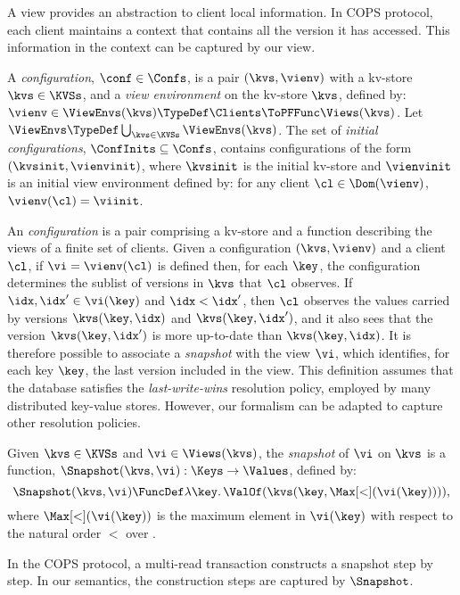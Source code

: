 A view provides an abstraction to client local information.
In COPS protocol, each client maintains a context that contains all the version it has accessed.
This information in the context can be captured by our view.

\begin{definition}[Configurations]
\label{def:configurations}
A \emph{configuration}, \(\conf \in \Confs\),  is a pair \((\kvs, \vienv)\)
with a kv-store \(\kvs \in \KVSs\),
and a \emph{view environment} on the kv-store \( \kvs \),
defined by: \(\vienv \in \ViewEnvs(\kvs) \TypeDef \Clients \ToPFFunc \Views(\kvs)\). 
Let \( \ViewEnvs \TypeDef \bigcup_{\kvs \in \KVSs} \ViewEnvs(\kvs)\).
The set of \emph{initial configurations}, \(\ConfInits \subseteq \Confs\),
contains configurations of the form \( (\kvsinit, \vienvinit)\),
where \( \kvsinit \) is the initial kv-store 
and \( \vienvinit \) is an initial view environment 
defined by: for any client \( \cl \in \Dom(\vienv)\), \( \vienv(\cl) = \viinit \).
\end{definition}

An \emph{configuration} is a pair comprising a kv-store and a function describing the
views of a finite set of clients. 
Given a configuration \((\kvs, \vienv)\) and a client \(\cl\), 
if \(\vi = \vienv(\cl)\) is defined then, for each \(\key\), 
the configuration determines the sublist of versions in \(\kvs\) that \(\cl\) observes.
If \(\idx, \idx' \in \vi(\key)\) and \(\idx < \idx'\), then \(\cl\) observes the values 
carried by versions \(\kvs(\key, \idx)\) and  \(\kvs(\key, \idx')\), 
and it also sees that the version \(\kvs(\key, \idx')\) is more up-to-date than \(\kvs(\key, \idx)\). 
It is therefore possible to associate a \emph{snapshot} with the view \(\vi\), 
which identifies, for each key \(\key\), the last version included in the view. 
This definition assumes that the database satisfies the \emph{last-write-wins}
resolution policy, employed by many distributed key-value stores.
However, our formalism can be adapted to capture other resolution policies. 

\begin{definition}
\label{def:view-snapshot}
Given \(\kvs \in \KVSs\) and \(\vi \in \Views(\kvs)\),
the \emph{snapshot} of \(\vi\) on \(\kvs\) is a function, 
\(\Snapshot(\kvs, \vi) : \Keys \to \Values\),
defined by:
\[
    \Snapshot(\kvs, \vi) \FuncDef \lambda \key \ldotp \ValOf(\kvs(\key, \Max[<](\vi(\key)))),
\]
where \(\Max[<](\vi(\key))\) is the maximum element in \(\vi(\key)\) with respect to the natural 
order \(<\) over \Nat.
\end{definition}

In the COPS protocol, a multi-read transaction constructs a snapshot step by step.
In our semantics, the construction steps are captured by \( \Snapshot \).
